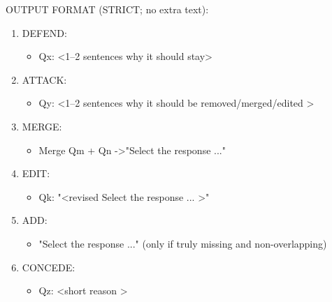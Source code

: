 \begin{minipage}{\textwidth}
\begin{tcolorbox}[
  enhanced jigsaw,
  breakable,
  colback=blue!5!white,
  colframe=blue!75!black,
  title={Debater Agent System Prompt},
  before skip=0pt,
  after skip=2pt,
  rounded corners
]
OUTPUT FORMAT (STRICT; no extra text):
\begin{enumerate}[noitemsep,nolistsep,leftmargin=*]
    \item DEFEND:
    \begin{itemize}[noitemsep,nolistsep,leftmargin=*]
        \item[-] Qx: \textless1–2 sentences why it should stay\textgreater
    \end{itemize}
    \item ATTACK:
    \begin{itemize}[noitemsep,nolistsep,leftmargin=*]
        \item[-] Qy: \textless 1–2 sentences why it should be removed/merged/edited \textgreater
    \end{itemize}

    \item MERGE:
    \begin{itemize}[noitemsep,nolistsep,leftmargin=*]
        \item[-] Merge Qm + Qn -\textgreater "Select the response ..."
    \end{itemize}

    \item EDIT:
    \begin{itemize}[noitemsep,nolistsep,leftmargin=*]
        \item[-] Qk: "\textless revised Select the response ... \textgreater"
    \end{itemize}

    \item ADD:
    \begin{itemize}[noitemsep,nolistsep,leftmargin=*]
        \item[-]"Select the response ..."  (only if truly missing and non-overlapping)
    \end{itemize}

    \item CONCEDE:
    \begin{itemize}[noitemsep,nolistsep,leftmargin=*]
        \item[-] Qz: \textless short reason \textgreater
    \end{itemize}
\end{enumerate}
\end{tcolorbox}
\vspace{10pt}
\captionsetup{skip=2pt}
\label{debater_prompt}
\end{minipage}

